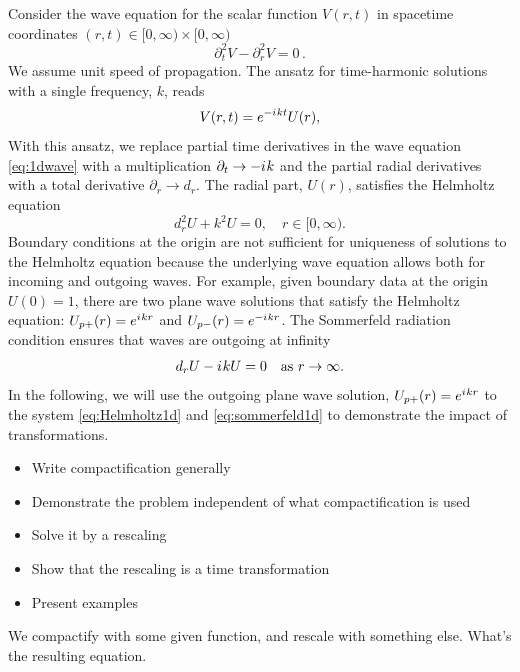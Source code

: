 \documentclass[final,onefignum,onetabnum]{siamart190516}
\newcommand{\be}{\begin{equation}}
\newcommand{\ee}{\end{equation}}
\newcommand{\iu}{{i\mkern1mu}}
\begin{document}
Consider the wave equation for the scalar function $V(r,t)$ in spacetime coordinates $(r,t)\in[0,\infty)\times[0,\infty)$
\be\label{eq:1dwave} \partial_t^2 V - \partial_r^2 V = 0\,. \ee
We assume unit speed of propagation. The ansatz for time-harmonic solutions with a single frequency, $k$, reads
\be\label{eq:ansatz} 
V(r,t)= e^{-\iu k t} U(r),
\ee 
With this ansatz, we replace partial time derivatives in the wave equation \eqref{eq:1dwave} with a multiplication $\partial_t\to-\iu k$ and the partial radial derivatives with a total derivative $\partial_r\to d_r$. The radial part, $U(r)$, satisfies the Helmholtz equation 
\be
\label {eq:Helmholtz1d} d_r^2 U + k^2 U = 0, \quad r\in[0,\infty).
\ee
Boundary conditions at the origin are not sufficient for uniqueness of solutions to the Helmholtz equation because the underlying wave equation allows both for incoming and outgoing waves. For example, given boundary data at the origin $U(0)=1$, there are two plane wave solutions that satisfy the Helmholtz equation: $U_{p+}(r) = e^{\iu k r}$ and $U_{p-}(r) = e^{-\iu k r}$. The Sommerfeld radiation condition ensures that waves are outgoing at infinity
\be
\label{eq:sommerfeld1d}d_r U - \iu k U = 0 \quad \mathrm{as} \ r\to\infty.
\ee
In the following, we will use the outgoing plane wave solution, $U_{p+}(r)=e^{\iu k r}$ to the system \eqref{eq:Helmholtz1d} and \eqref{eq:sommerfeld1d} to demonstrate the impact of transformations.

\begin{itemize}
\item Write compactification generally
\item Demonstrate the problem independent of what compactification is used
\item Solve it by a rescaling
\item Show that the rescaling is a time transformation
\item Present examples
\end{itemize}

We compactify with some given function, and rescale with something else. What's the resulting equation.
\end{document}
